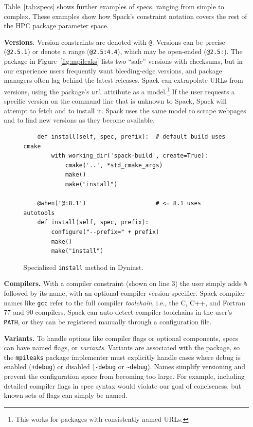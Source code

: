 Table~\ref{tab:specs} shows further examples of specs, ranging from
simple to complex. These examples show how Spack's constraint
notation covers the rest of the HPC package parameter space.

{\bf Versions.}
Version constraints are denoted with {\tt @}. Versions
can be precise ({\tt @2.5.1}) or denote a range ({\tt @2.5:4.4}),
which may be open-ended ({\tt @2.5:}).
%
The package in Figure~\ref{fig:mpileaks} lists two ``safe'' versions with
checksums, but
in our experience users frequently want bleeding-edge versions, and package managers
often lag behind the latest releases.
Spack can extrapolate URLs from versions,
using the package's {\tt url} attribute as a model.\footnote{This works
for packages with consistently named URLs.}  If the user requests a specific
version on the command line that is unknown to Spack,
Spack will attempt to fetch and to install it.  Spack uses the same
model to scrape webpages and to find new versions as they become available.

\begin{figure}
\begin{verbatim}
    def install(self, spec, prefix):  # default build uses cmake
        with working_dir('spack-build', create=True):
            cmake('..', *std_cmake_args)
            make()
            make("install")

    @when('@:8.1')                    # <= 8.1 uses autotools
    def install(self, spec, prefix):
        configure("--prefix=" + prefix)
        make()
        make("install")
\end{verbatim}
\caption{
    Specialized {\tt install} method in Dyninst.
	\label{fig:specialization}
}
\end{figure}

{\bf Compilers.}
With a compiler constraint (shown on line 3) the user
simply adds {\tt \%} followed by its name, with an optional compiler version
specifier.  Spack compiler names like {\tt gcc} refer to the full compiler {\it toolchain},
i.e., the C, C++, and Fortran 77 and 90 compilers.  Spack can auto-detect
compiler toolchains in the user's {\tt PATH}, or they can be registered manually
through a configuration file.

{\bf Variants.}
To handle options like compiler flags or optional components, specs can
have named flags, or {\it variants}.  Variants are associated with the package,
so the {\tt mpileaks} package implementer must explicitly handle cases
where debug is enabled ({\tt +debug}) or disabled ({\tt -debug}
or {\tt \textasciitilde \ignorespaces debug}).  Names simplify versioning
and prevent the configuration space from becoming too large.
For example, including detailed compiler flags in spec syntax
would violate our goal of conciseness, but known sets of flags can simply be named.

